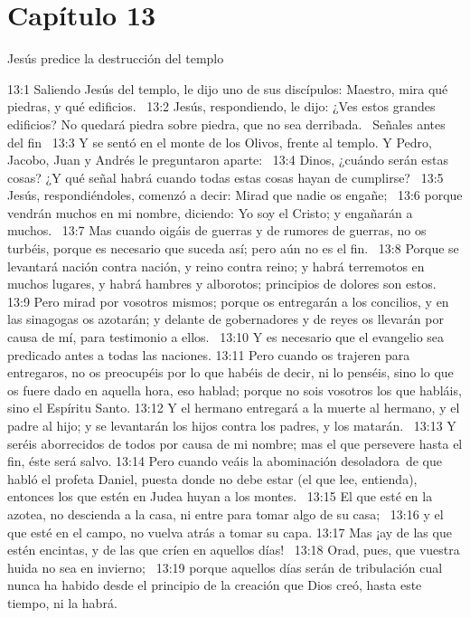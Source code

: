 \section*{Capítulo 13}
Jesús predice la destrucción del templo   

13:1 Saliendo Jesús del templo, le dijo uno de sus discípulos: Maestro, mira qué piedras, y qué edificios.  
13:2 Jesús, respondiendo, le dijo: ¿Ves estos grandes edificios? No quedará piedra sobre piedra, que no sea derribada.  
Señales antes del fin   
13:3 Y se sentó en el monte de los Olivos, frente al templo. Y Pedro, Jacobo, Juan y Andrés le preguntaron aparte:  
13:4 Dinos, ¿cuándo serán estas cosas? ¿Y qué señal habrá cuando todas estas cosas hayan de cumplirse?  
13:5 Jesús, respondiéndoles, comenzó a decir: Mirad que nadie os engañe;  
13:6 porque vendrán muchos en mi nombre, diciendo: Yo soy el Cristo; y engañarán a muchos.  
13:7 Mas cuando oigáis de guerras y de rumores de guerras, no os turbéis, porque es necesario que suceda así; pero aún no es el fin.  
13:8 Porque se levantará nación contra nación, y reino contra reino; y habrá terremotos en muchos lugares, y habrá hambres y alborotos; principios de dolores son estos.  
13:9 Pero mirad por vosotros mismos; porque os entregarán a los concilios, y en las sinagogas os azotarán; y delante de gobernadores y de reyes os llevarán por causa de mí, para testimonio a ellos.  
13:10 Y es necesario que el evangelio sea predicado antes a todas las naciones. 
13:11 Pero cuando os trajeren para entregaros, no os preocupéis por lo que habéis de decir, ni lo penséis, sino lo que os fuere dado en aquella hora, eso hablad; porque no sois vosotros los que habláis, sino el Espíritu Santo. 
13:12 Y el hermano entregará a la muerte al hermano, y el padre al hijo; y se levantarán los hijos contra los padres, y los matarán.  
13:13 Y seréis aborrecidos de todos por causa de mi nombre; mas el que persevere hasta el fin, éste será salvo. 
13:14 Pero cuando veáis la abominación desoladora de que habló el profeta Daniel, puesta donde no debe estar (el que lee, entienda), entonces los que estén en Judea huyan a los montes.  
13:15 El que esté en la azotea, no descienda a la casa, ni entre para tomar algo de su casa;  
13:16 y el que esté en el campo, no vuelva atrás a tomar su capa. 
13:17 Mas ¡ay de las que estén encintas, y de las que críen en aquellos días!  
13:18 Orad, pues, que vuestra huida no sea en invierno;  
13:19 porque aquellos días serán de tribulación cual nunca ha habido desde el principio de la creación que Dios creó, hasta este tiempo, ni la habrá.  
